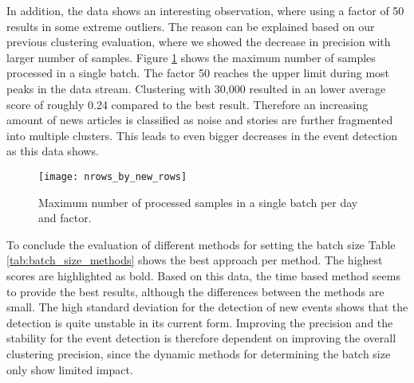 In addition, the data shows an interesting observation, where using a factor of 50 results in some extreme outliers. The reason can be explained based on our previous clustering evaluation, where we showed the decrease in precision with larger number of samples. Figure \ref{fig:nrows_by_new_rows} shows the maximum number of samples processed in a single batch. The factor 50 reaches the upper limit during most peaks in the data stream. Clustering with 30,000 resulted in an lower average score of roughly 0.24 compared to the best result. Therefore an increasing amount of news articles is classified as noise and stories are further fragmented into multiple clusters. This leads to even bigger decreases in the event detection as this data shows.


\begin{figure}[h]
    \centering
    \texttt{[image: nrows\_by\_new\_rows]}
    \caption{Maximum number of processed samples in a single batch per day and factor.}
    \label{fig:nrows_by_new_rows}
 \end{figure}

 To conclude the evaluation of different methods for setting the batch size Table \ref{tab:batch_size_methods} shows the best approach per method. The highest scores are highlighted as bold. Based on this data, the time based method seems to provide the best results, although the differences between the methods are small. The high standard deviation for the detection of new events shows that the detection is quite unstable in its current form. Improving the precision and the stability for the event detection is therefore dependent on improving the overall clustering precision, since the dynamic methods for determining the batch size only show limited impact.  

\begin{table}[h]
    \centering
    \caption{Final scores obtained by each method for setting the batch size.}
    \label{tab:batch_size_methods}
\end{table}

